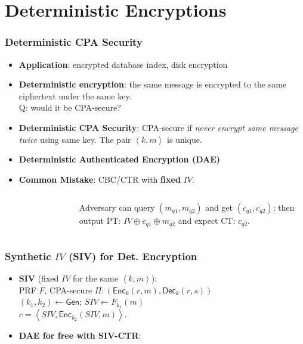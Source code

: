 \section{Deterministic Encryptions}
\begin{frame}\frametitle{Deterministic CPA Security}
\begin{itemize}
\item \textbf{Application}: encrypted database index, disk encryption
\item \textbf{Deterministic encryption}: the same message is encrypted to the same ciphertext under the same key. \\ \alert{Q: would it be  CPA-secure?}
\item \textbf{Deterministic CPA Security}: CPA-secure if \emph{never encrypt same message twice} using same key. The pair $\left<k,m\right>$ is unique.
\item \textbf{Deterministic Authenticated Encryption (DAE)}
\item \textbf{\alert{Common Mistake}}: CBC/CTR with \textbf{fixed} $IV$.
\begin{columns}[]
\begin{figure}
\begin{center}

\end{center}
\end{figure}
Adversary can query $(m_{q1}, m_{q2})$ and get $(c_{q1}, c_{q2})$; then output PT: $ IV\oplus c_{q1} \oplus m_{q2}$ and expect CT: $c_{q2}$.
\end{columns}
\end{itemize}
\end{frame}
\begin{frame}\frametitle{Synthetic $IV$ (SIV) for Det. Encryption}
\begin{itemize}
\item \textbf{SIV} (fixed $IV$ for the same $\left<k,m\right>$): \\
PRF $F$, CPA-secure $\Pi:(\mathsf{Enc}_k(r,m), \mathsf{Dec}_k(r,s))$\\ 
$(k_1,k_2) \gets \mathsf{Gen}$; $SIV \gets F_{k_1}(m)$\\ 
$c = \left<SIV,\mathsf{Enc}_{k_2}(SIV,m) \right>$.
\item \textbf{DAE for free with SIV-CTR}: %
\begin{figure}
\begin{center}

\end{center}
\end{figure}
\end{itemize}
\end{frame}
